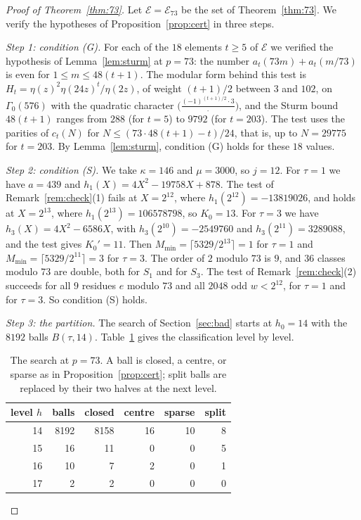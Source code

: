 \documentclass[12pt]{amsart}
\theoremstyle{definition}
\newcommand{\cE}{\mathcal{E}}
\newcommand{\B}{B}
\newcommand{\lean}[1]{\ignorespaces}
\newcommand{\computed}[2]{\ignorespaces}
\newcommand{\mapitem}[1]{\ignorespaces}
\begin{document}
\begin{proof}[Proof of Theorem~\ref{thm:73}]
Let $\cE=\cE_{73}$ be the set of Theorem~\ref{thm:73}. We verify the hypotheses of Proposition~\ref{prop:cert} in three steps.

\emph{Step 1: condition (G).}
\mapitem{Section~\ref{sec:proof}, proof of Theorem~\ref{thm:73}, step 1}
\lean{\decl{KeithZanello.sturmTest_all}, the test of Lemma~\ref{lem:sturm} at $p=73$ for the eighteen centres}
\computed{gp -q paper/small_checks.gp, part 5}{paper/small_checks.out}
For each of the $18$ elements $t\ge5$ of $\cE$ we verified the hypothesis of Lemma~\ref{lem:sturm} at $p=73$: the number $a_t(73m)+a_t(m/73)$ is even for $1\le m\le48(t+1)$. The modular form behind this test is $H_t=\eta(z)^2\eta(24z)^t/\eta(2z)$, of weight $(t+1)/2$ between $3$ and $102$, on $\Gamma_0(576)$ with the quadratic character $\bigl(\frac{(-1)^{(t+1)/2}\cdot3}{\cdot}\bigr)$, and the Sturm bound $48(t+1)$ ranges from $288$ (for $t=5$) to $9792$ (for $t=203$). The test uses the parities of $c_t(N)$ for $N\le(73\cdot48(t+1)-t)/24$, that is, up to $N=29775$ for $t=203$. By Lemma~\ref{lem:sturm}, condition (G) holds for these $18$ values.

\emph{Step 2: condition (S).}
\mapitem{Section~\ref{sec:proof}, proof of Theorem~\ref{thm:73}, step 2}
\lean{\decl{KeithZanello.condS1} and \decl{KeithZanello.condS3}}
\computed{gp -q paper/small_checks.gp, part 6}{paper/small_checks.out}
We take $\kappa=146$ and $\mu=3000$, so $j=12$. For $\tau=1$ we have $a=439$ and $h_1(X)=4X^2-19758X+878$. The test of Remark~\ref{rem:check}(1) fails at $X=2^{12}$, where $h_1(2^{12})=-13819026$, and holds at $X=2^{13}$, where $h_1(2^{13})=106578798$, so $K_0=13$. For $\tau=3$ we have $h_3(X)=4X^2-6586X$, with $h_3(2^{10})=-2549760$ and $h_3(2^{11})=3289088$, and the test gives $K_0'=11$. Then $M_{\min}=\lceil5329/2^{13}\rceil=1$ for $\tau=1$ and $M_{\min}=\lceil5329/2^{11}\rceil=3$ for $\tau=3$. The order of $2$ modulo $73$ is $9$, and $36$ classes modulo $73$ are double, both for $S_1$ and for $S_3$. The test of Remark~\ref{rem:check}(2) succeeds for all $9$ residues $e$ modulo $73$ and all $2048$ odd $w<2^{12}$, for $\tau=1$ and for $\tau=3$. So condition (S) holds.

\emph{Step 3: the partition.} The search of Section~\ref{sec:bad} starts at $h_0=14$ with the $8192$ balls $\B(\tau,14)$. Table~\ref{tab:tree73} gives the classification level by level.

\begin{table}[ht]
\caption{The search at $p=73$. A ball is closed, a centre, or sparse as in Proposition~\ref{prop:cert}; split balls are replaced by their two halves at the next level.}\label{tab:tree73}
\begin{tabular}{rrrrrr}
\hline
level $h$ & balls & closed & centre & sparse & split\\
\hline
14 & 8192 & 8158 & 16 & 10 & 8\\
15 & 16 & 11 & 0 & 0 & 5\\
16 & 10 & 7 & 2 & 0 & 1\\
17 & 2 & 2 & 0 & 0 & 0\\
\hline
\end{tabular}
\end{table}


\end{proof}
\end{document}
